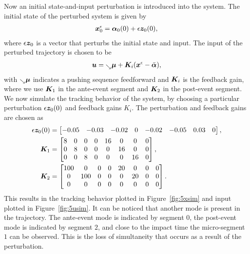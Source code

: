 \documentclass[../DC2019003Bouma.tex]{subfiles}
\begin{document}
Now an initial state-and-input perturbation is introduced into the system. The initial state of the perturbed system is given by
\begin{align}
{\boldsymbol{x}}^\epsilon_0 = \boldsymbol{\alpha}_0(0) + \epsilon{\boldsymbol{z}}_0(0),
\end{align}
where $\epsilon{\boldsymbol{z}}_0$ is a vector that perturbs the initial state and input. The input of the perturbed trajectory is chosen to be
\begin{align}
{\boldsymbol{u}} = \hspace{0cm}_{\searrow}\boldsymbol{\mu} + {\boldsymbol{K}}_i({\boldsymbol{x}}^\epsilon-\bar{\boldsymbol{\alpha}}),
\end{align}
with $\hspace{0cm}_{\searrow}\boldsymbol{\mu}$ indicates a pushing sequence feedforward and ${\boldsymbol{K}}_i$ is the feedback gain, where we use ${\boldsymbol{K}}_1$ in the ante-event segment and ${\boldsymbol{K}}_2$ in the post-event segment. We now simulate the tracking behavior of the system, by choosing a particular perturbation $\epsilon{\boldsymbol{z}}_0(0)$ and feedback gains $K_i$. The perturbation and feedback gains are chosen as
\begin{align}
\epsilon{\boldsymbol{z}}_0(0) &= \begin{bmatrix}-0.05 & -0.03 & -0.02 & 0 & -0.02 & -0.05 & 0.03 & 0 \end{bmatrix},\\
{\boldsymbol{K}}_1 &= \begin{bmatrix}
8 & 0 & 0 & 0 & 16 & 0  & 0  & 0\\
0 & 8 & 0 & 0 & 0  & 16 & 0  & 0\\
0 & 0 & 8 & 0 & 0  & 0  & 16 & 0
\end{bmatrix},\\
{\boldsymbol{K}}_2 &= \begin{bmatrix}
100 & 0   & 0 & 0 & 20 & 0  & 0 & 0\\
0   & 100 & 0 & 0 & 0  & 20 & 0 & 0\\
0   & 0   & 0 & 0 & 0  & 0  & 0 & 0
\end{bmatrix}.
\end{align}
This results in the tracking behavior plotted in Figure~\ref{fig:5xsim} and input plotted in Figure~\ref{fig:5usim}. It can be noticed that another mode is present in the trajectory. The ante-event mode is indicated by segment $0$, the post-event mode is indicated by segment $2$, and close to the impact time the micro-segment $1$ can be observed. This is the loss of simultaneity that occurs as a result of the perturbation.
\end{document}
